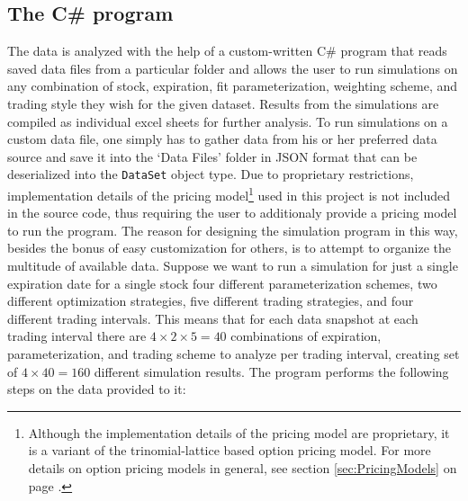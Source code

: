 \documentclass[12pt, a4paper, notitlepage]{article}
\def\code#1{\texttt{#1}}
\numberwithin{equation}{subsection}
\numberwithin{figure}{subsection}
\numberwithin{table}{subsection}
\newcommand{\newpar}{\newline \newline}
\begin{document}
\subsection{The C\# program}
The data is analyzed with the help of a custom-written C\# program that reads saved data files from a particular folder and allows the user to run simulations on any combination of stock, expiration, fit parameterization, weighting scheme, and trading style they wish for the given dataset.  Results from the simulations are compiled as individual excel sheets for further analysis.  To run simulations on a custom data file, one simply has to gather data from his or her preferred data source and save it into the `Data Files' folder in JSON format that can be deserialized into the \code{DataSet} object type.  Due to proprietary restrictions, implementation details of the pricing model\footnote{Although the implementation details of the pricing model are proprietary, it is a variant of the trinomial-lattice based option pricing model.  For more details on option pricing models in general, see section \ref{sec:PricingModels} on page \pageref{sec:PricingModels}.} used in this project is not included in the source code, thus requiring the user to additionaly provide a pricing model to run the program.
\newpar
The reason for designing the simulation program in this way, besides the bonus of easy customization for others, is to attempt to organize the multitude of available data.  Suppose we want to run a simulation for just a single expiration date for a single stock four different parameterization schemes, two different optimization strategies, five different trading strategies, and four different trading intervals.  This means that for each data snapshot at each trading interval there are $4 \times 2 \times 5 = 40$ combinations of expiration, parameterization, and trading scheme to analyze per trading interval, creating set of $4 \times 40 = 160$ different simulation results.
\newpar
The program performs the following steps on the data provided to it:
\end{document}
